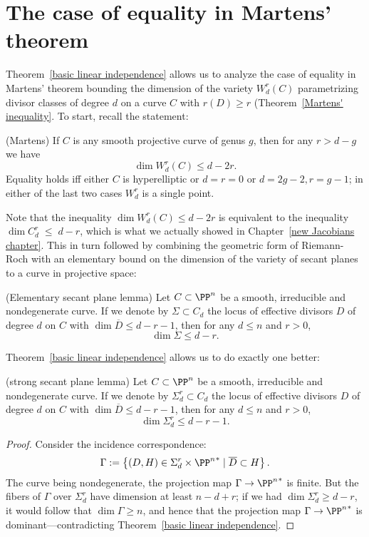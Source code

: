 \section{The case of equality in Martens' theorem}

Theorem~\ref{basic linear independence}  allows us to analyze the case of equality in Martens' theorem bounding the dimension of the variety $W^r_d(C)$ parametrizing divisor classes of degree $d$ on a curve $C$ with $r(D) \geq r$
(Theorem~\ref{Martens' inequality}.
To start, recall the statement:

\begin{theorem}(Martens)\label{full Martens}
If $C$ is any smooth projective curve of genus $g$, then for any $r>d-g$ we have
$$
\dim W^r_d(C) \leq d-2r.
$$
Equality holds iff either $C$ is hyperelliptic
or $d=r=0$ or $d=2g-2, r=g-1$; in either of the last two cases $W^r_d$ is
a single point.
\end{theorem}

Note that the inequality $\dim W^r_d(C) \leq d-2r$ is equivalent to the inequality $\dim C^r_d \; \leq \; d-r$, which is what we actually showed in Chapter~\ref{new Jacobians chapter}. This in turn followed by combining the geometric form of Riemann-Roch with an elementary bound on the dimension of the variety of secant planes to a curve in projective space:

\begin{lemma}(Elementary secant plane lemma)
Let $C \subset \PP^n$ be a smooth, irreducible and nondegenerate curve. If we denote by $\Sigma \subset C_d$ the locus of effective divisors $D$ of degree $d$ on $C$ with $\dim \overline D \leq d-r-1$, then for any $d \leq n$ and $r > 0$,
$$
\dim \Sigma \leq d-r.
$$
\end{lemma}

Theorem~\ref{basic linear independence} allows us to do exactly one better: 

\begin{lemma}(strong secant plane lemma)\label{Strong secant plane lemma}
Let $C \subset \PP^n$ be a smooth, irreducible and nondegenerate curve. If we denote by $\Sigma^r_d \subset C_d$ the locus of effective divisors $D$ of degree $d$ on $C$ with $\dim \overline D \leq d-r-1$, then for any $d \leq n$ and $r > 0$,
$$
\dim \Sigma^r_d \leq d-r-1.
$$
\end{lemma}

\begin{proof}
Consider the incidence correspondence: 
$$
\Gamma := \left\{ (D, H) \in \Sigma^r_d\times {\PP^n}^* \mid \overline D \subset H \right\}.
$$
The curve being nondegenerate, the projection map $\Gamma \to  {\PP^n}^*$ is finite. But the fibers of $\Gamma$ over $\Sigma^r_d$ have dimension at least $n-d+r$; if we had $\dim \Sigma^r_d \geq d-r$, it would follow that $\dim \Gamma \geq n$, and hence that the projection map $\Gamma \to  {\PP^n}^*$ is dominant---contradicting Theorem~\ref{basic linear independence}.
\end{proof}

